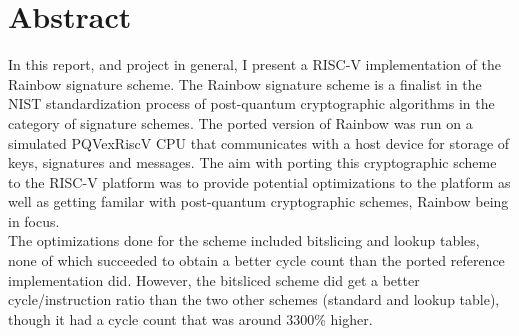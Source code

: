 \section*{Abstract}
In this report, and project in general, I present a RISC-V implementation of the Rainbow signature scheme. The Rainbow signature scheme is a finalist in the NIST standardization process of post-quantum cryptographic algorithms in the category of signature schemes. The ported version of Rainbow was run on a simulated PQVexRiscV CPU that communicates with a host device for storage of keys, signatures and messages. The aim with porting this cryptographic scheme to the RISC-V platform was to provide potential optimizations to the platform as well as getting familar with post-quantum cryptographic schemes, Rainbow being in focus.\medskip\\
The optimizations done for the scheme included bitslicing and lookup tables, none of which succeeded to obtain a better cycle count than the ported reference implementation did. However, the bitsliced scheme did get a better cycle/instruction ratio than the two other schemes (standard and lookup table), though it had a cycle count that was around 3300\% higher.
\pagebreak